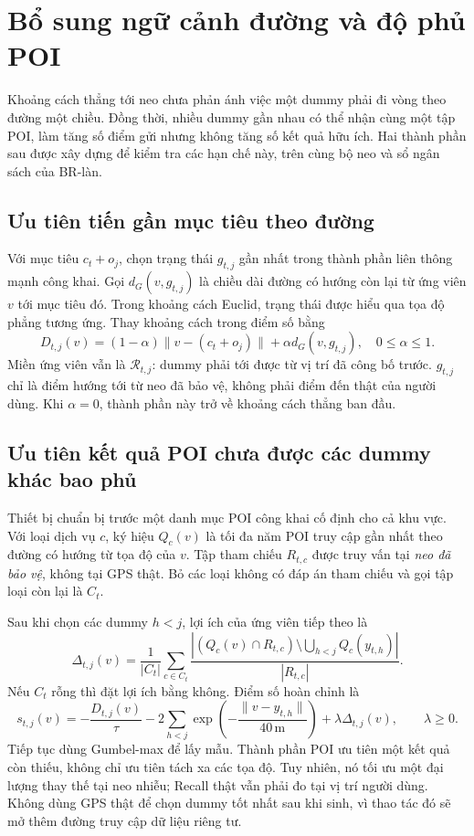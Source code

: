 \section{Bổ sung ngữ cảnh đường và độ phủ POI}
\label{sec:context-method}

Khoảng cách thẳng tới neo chưa phản ánh việc một dummy phải đi vòng theo đường một chiều. Đồng thời, nhiều dummy gần nhau có thể nhận cùng một tập POI, làm tăng số điểm gửi nhưng không tăng số kết quả hữu ích. Hai thành phần sau được xây dựng để kiểm tra các hạn chế này, trên cùng bộ neo và sổ ngân sách của BR-làn.

\subsection{Ưu tiên tiến gần mục tiêu theo đường}

Với mục tiêu $c_t+o_j$, chọn trạng thái $g_{t,j}$ gần nhất trong thành phần liên thông mạnh công khai. Gọi $d_G(v,g_{t,j})$ là chiều dài đường có hướng còn lại từ ứng viên $v$ tới mục tiêu đó. Trong khoảng cách Euclid, trạng thái được hiểu qua tọa độ phẳng tương ứng. Thay khoảng cách trong điểm số bằng
\[
D_{t,j}(v)=(1-\alpha)\|v-(c_t+o_j)\|+\alpha d_G(v,g_{t,j}),\quad 0\leq\alpha\leq1.
\]
Miền ứng viên vẫn là $\mathcal R_{t,j}$: dummy phải tới được từ vị trí đã công bố trước. $g_{t,j}$ chỉ là điểm hướng tới từ neo đã bảo vệ, không phải điểm đến thật của người dùng. Khi $\alpha=0$, thành phần này trở về khoảng cách thẳng ban đầu.

\subsection{Ưu tiên kết quả POI chưa được các dummy khác bao phủ}

Thiết bị chuẩn bị trước một danh mục POI công khai cố định cho cả khu vực. Với loại dịch vụ $c$, ký hiệu $Q_c(v)$ là tối đa năm POI truy cập gần nhất theo đường có hướng từ tọa độ của $v$. Tập tham chiếu $R_{t,c}$ được truy vấn tại \emph{neo đã bảo vệ}, không tại GPS thật. Bỏ các loại không có đáp án tham chiếu và gọi tập loại còn lại là $C_t$.

Sau khi chọn các dummy $h<j$, lợi ích của ứng viên tiếp theo là
\[
\Delta_{t,j}(v)=\frac{1}{|C_t|}\sum_{c\in C_t}
\frac{\left|\left(Q_c(v)\cap R_{t,c}\right)\setminus
\bigcup_{h<j}Q_c(y_{t,h})\right|}{|R_{t,c}|}.
\]
Nếu $C_t$ rỗng thì đặt lợi ích bằng không. Điểm số hoàn chỉnh là
\[
s_{t,j}(v)=-\frac{D_{t,j}(v)}{\tau}
-2\sum_{h<j}\exp\!\left(-\frac{\|v-y_{t,h}\|}{40\,\mathrm{m}}\right)
+\lambda\Delta_{t,j}(v),\qquad \lambda\geq0.
\]
Tiếp tục dùng Gumbel-max để lấy mẫu. Thành phần POI ưu tiên một kết quả còn thiếu, không chỉ ưu tiên tách xa các tọa độ. Tuy nhiên, nó tối ưu một đại lượng thay thế tại neo nhiễu; Recall thật vẫn phải đo tại vị trí người dùng. Không dùng GPS thật để chọn dummy tốt nhất sau khi sinh, vì thao tác đó sẽ mở thêm đường truy cập dữ liệu riêng tư.

